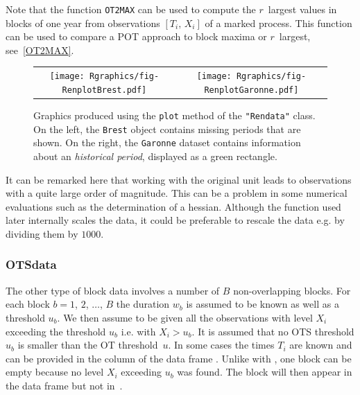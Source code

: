 \documentclass[a4paper]{report}
\begin{document}
Note that the function \texttt{OT2MAX} can be used to compute the
$r$~largest values in blocks of one year from observations
$[T_i,\,X_i]$ of a marked process. This function can be used to
compare a POT approach to block maxima or $r$~largest,
see~\ref{OT2MAX}.

\begin{figure}
   \centering
   \begin{tabular}{c c} 
     \texttt{[image: Rgraphics/fig-RenplotBrest.pdf]} &
     \texttt{[image: Rgraphics/fig-RenplotGaronne.pdf]} 
   \end{tabular}
   \caption{\label{RENPLOTS} Graphics produced using the \texttt{plot}
     method of the \texttt{"Rendata"} class. On the left, the
     \texttt{Brest} object contains missing periods that are shown.
     On the right, the \texttt{Garonne} dataset contains information
     about an \textit{historical period}, displayed as a green rectangle.  }
\end{figure}

It can be remarked here that working with the original unit leads to
observations with a quite large order of magnitude. This can be a
problem in some numerical evaluations such as the determination of a
hessian.   Although the \verb@Renouv@ function used
later internally scales the data, it could be preferable to rescale
the data e.g. by dividing them by $1000$.

\subsubsection*{OTSdata}
%

The other type of block data involves a number of $B$ non-overlapping
blocks.  For each block $b=1$, $2$, $\dots$, $B$ the duration $w_b$ is
assumed to be known as well as a threshold $u_b$. We then assume to be
given all the observations with level $X_i$ exceeding the threshold
$u_b$ i.e. with $X_i > u_b$.  It is assumed that no OTS threshold
$u_b$ is smaller than the OT threshold~$u$. In some cases the
times $T_i$ are known and can be provided in the \verb@date@ column
of the data frame \verb@OTSdata@.  Unlike with \verb@MAXdata@, one
block can be empty because no level $X_i$ exceeding $u_b$ was
found. The block will then appear in the \verb@OTSinfo@ data frame
but not in~\verb@OTSdata@.
\end{document}
